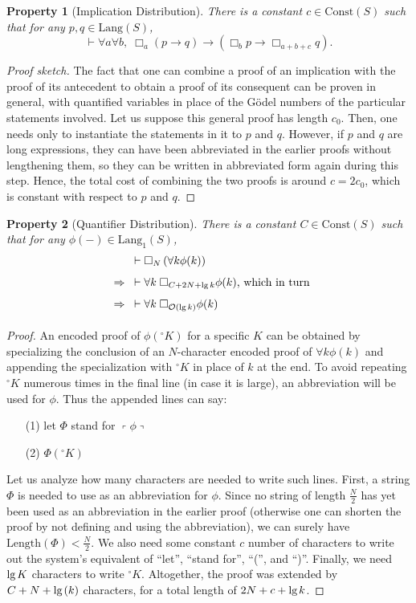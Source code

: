 \documentclass[onecolumn]{miri-tech-article}
\newtheorem{property}{Property}
\numberwithin{equation}{section}
\theoremstyle{definition}
\newcommand{\Oo}{\mathcal{O}}
\newcommand{\proves}[1]{\underset{#1}{\vdash}}
\newcommand{\bx}[1]{\Box_{#1}}
\newcommand{\Lang}{\mathrm{Lang}}
\newcommand{\Const}{\mathrm{Const}}
\renewcommand{\implies}{\rightarrow}
\newcommand{\Implies}{\;\;\Rightarrow\;\;}
\newcommand{\qquote}[1]{\left\ulcorner #1 \right\urcorner}
\newcommand{\numeral}{{}^\circ}
\renewcommand{\lg}{\mathrm{lg\hspace{0.3ex}}}
\renewcommand{\-}{^{-1}}
\begin{document}
\begin{property}[Implication Distribution]
There is a constant $c\in \Const(S)$ such that for any $p,q\in\Lang(S)$,
$$\proves{} \forall a\forall b,\; \bx{a}(p\implies q) \implies (\bx{b}p \implies \bx{a+b+c} q).$$
\end{property}

\begin{proof}[Proof sketch]
The fact that one can combine a proof of an implication with the proof of its antecedent to obtain a proof of its consequent can be proven in general, with quantified variables in place of the G\"{o}del numbers of the particular statements involved.  Let us suppose this general proof has length $c_0$.  Then, one needs only to instantiate the statements in it to $p$ and $q$.  However, if $p$ and $q$ are long expressions, they can have been abbreviated in the earlier proofs without lengthening them, so they can be written in abbreviated form again during this step.  Hence, the total cost of combining the two proofs is around $c=2c_0$, which is constant with respect to $p$ and $q$.
\end{proof}

\begin{property}[Quantifier Distribution]
There is a constant $C\in \Const(S)$ such that for any $\phi(-) \in \Lang_1(S)$,
\begin{align*}
             &\proves{}\bx{N}\left(\forall k \phi(k)\right)\\
\Implies &\proves{} \forall k \; \bx{C+2N+\lg k} \phi(k)\text{, which in turn}\\
\Implies &\proves{} \forall k \; \bx{\Oo(\lg k)} \phi(k)
\end{align*}
\end{property}

\begin{proof}
An encoded proof of $\phi(\numeral K)$ for a specific $K$ can be obtained by specializing the conclusion of an $N$-character encoded proof of $\forall k \phi(k)$ and appending the specialization with $\numeral K$ in place of $k$ at the end.  To avoid repeating $\numeral K$ numerous times in the final line (in case it is large), an abbreviation will be used for $\phi$.  Thus the appended lines can say:
\begin{itemize}
\item[(1)] let $\Phi$ stand for $\qquote{\phi}$
\item[(2)] $\Phi(\numeral K)$
\end{itemize}
Let us analyze how many characters are needed to write such lines.  First, a string $\Phi$ is needed to use as an abbreviation for $\phi$.  Since no string of length $\frac{N}{2}$ has yet been used as an abbreviation in the earlier proof (otherwise one can shorten the proof by not defining and using the abbreviation), we can surely have $\mathrm{Length}(\Phi)<\frac{N}{2}$.  We also need some constant $c$ number of characters to write out the system's equivalent of ``let'', ``stand for'', ``('', and ``)''.  Finally, we need $\lg K$ characters to write $\numeral K$.  Altogether, the proof was extended by $C+N+\lg(k)$ characters, for a total length of $2N+c+\lg k$.  
\end{proof}
\end{document}
